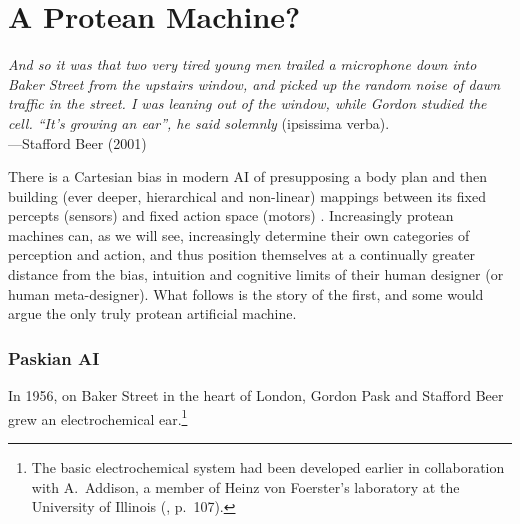 



\newpage
\section{A Protean Machine?}

\begin{changemargin}{4em}{4em} 

\vspace{1em}

\textit{And so it was that two very tired young men trailed a microphone down into Baker Street from the upstairs window, and picked up the random noise of dawn traffic in the street. 
I was leaning out of the window, while Gordon studied the cell. 
``It's growing an ear'', he said solemnly} (ipsissima verba). \\[1em]
\hspace*{16.5em} ---Stafford Beer (2001)

\vspace{1em}

\end{changemargin}



\noindent
There is a Cartesian bias in modern AI of presupposing a body plan and then building (ever deeper, hierarchical and non-linear) mappings between its fixed percepts (sensors) and fixed action space (motors) \cite{lecun2015deep}.
Increasingly protean machines can,
as we will see,
increasingly determine their own categories of perception and action, 
and thus
position themselves at a
continually greater distance from the bias, intuition and cognitive limits of their human designer (or human meta-designer).
What follows is the story of the first, and some would argue the only truly protean artificial machine.


\subsubsection{Paskian AI}

In 1956, on Baker Street in the heart of London,
Gordon Pask and Stafford Beer grew an electrochemical ear.\footnote{%
The basic electrochemical system had been developed earlier in collaboration with A.~Addison,
a member of Heinz von Foerster's laboratory at the University of Illinois
(\cite{pask1961approach}, p.~107).
}

